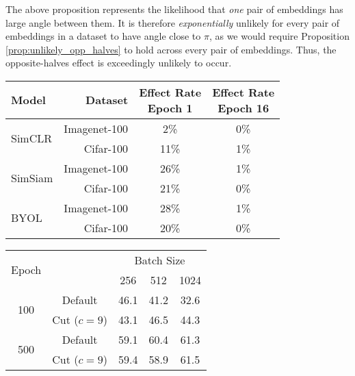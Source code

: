 The above proposition represents the likelihood that \emph{one} pair of embeddings has large angle between them. It is therefore \emph{exponentially} unlikely for every pair of embeddings in a dataset to have angle close to $\pi$, as we would require Proposition \ref{prop:unlikely_opp_halves} to hold across every pair of embeddings. Thus, the opposite-halves effect is exceedingly unlikely to occur.

\begin{table}
    \centering
    \quad
    \parbox{.47\linewidth}{
        \begin{tabular}{lrcc}
        \toprule
        Model & Dataset \quad\quad & \makecell{Effect Rate\\Epoch 1} & \makecell{Effect Rate\\Epoch 16} \\
        \midrule
        \multirow{2}{*}{SimCLR} & Imagenet-100 & 2\% & 0\%  \\
        & Cifar-100 & 11\% & 1\% \\
        \cmidrule{1-4}
        \multirow{2}{*}{SimSiam} & Imagenet-100 & 26\% & 1\% \\
        & Cifar-100 & 21\% & 0\% \\
        \cmidrule{1-4}
        \multirow{2}{*}{BYOL} & Imagenet-100 & 28\% & 1\% \\
        & Cifar-100 & 20\% & 0\% \\
        \bottomrule
        \end{tabular}
        \label{tbl:opposite_halves_effect}
    }
    \hfill
    \parbox{.38\linewidth}{
        \begin{tabular}{cc ccc}
        \toprule
        \multirow{2}{*}{Epoch} & & \multicolumn{3}{c}{Batch Size}\\
        & & 256 & 512 & 1024 \\
        \cmidrule{3-5}
        \multirow{2}{*}{100} & Default & 46.1 & 41.2 & 32.6 \\
        & Cut ($c=9$) & 43.1 & 46.5 & 44.3 \\
        \cmidrule{2-5}
        \multirow{2}{*}{500} & Default & 59.1 & 60.4 & 61.3\\
        & Cut ($c=9$) & 59.4 & 58.9 & 61.5 \\
        \bottomrule
        \end{tabular}
        \label{tbl:cut_batch_size}
    }
\end{table}

